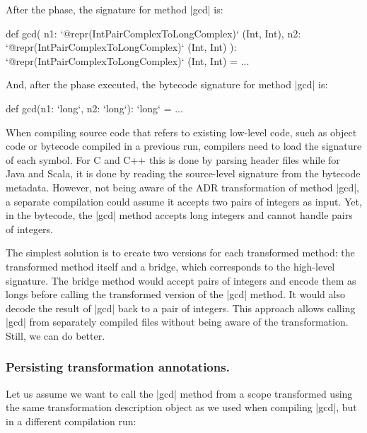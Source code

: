 After the \inject{} phase, the signature for method |gcd| is:

\begin{lstlisting-nobreak}
def gcd(
    n1: `@repr(IntPairComplexToLongComplex)` (Int, Int),
    n2: `@repr(IntPairComplexToLongComplex)` (Int, Int)
  ): `@repr(IntPairComplexToLongComplex)` (Int, Int) = ...
\end{lstlisting-nobreak}

And, after the \commit{} phase executed, the bytecode signature for method |gcd| is:

\begin{lstlisting-nobreak}
def gcd(n1: `long`, n2: `long`): `long` = ...
\end{lstlisting-nobreak}

When compiling source code that refers to existing low-level code, such as object code or bytecode compiled in a previous run, compilers need to load the signature of each symbol. For C and C++ this is done by parsing header files while for Java and Scala, it is done by reading the source-level signature from the bytecode metadata. However, not being aware of the ADR transformation of method |gcd|, a separate compilation could assume it accepts two pairs of integers as input. Yet, in the bytecode, the |gcd| method accepts long integers and cannot handle pairs of integers.

The simplest solution is to create two versions for each transformed method: the transformed method itself and a bridge, which corresponds to the high-level signature. The bridge method would accept pairs of integers and encode them as longs before calling the transformed version of the |gcd| method. It would also decode the result of |gcd| back to a pair of integers. This approach allows calling |gcd| from separately compiled files without being aware of the transformation. Still, we can do better.

\vspace{-0.45em}
\subsubsection{Persisting transformation annotations.} Let us assume we want to call the |gcd| method from a scope transformed using the same transformation description object as we used when compiling |gcd|, but in a different compilation run:


